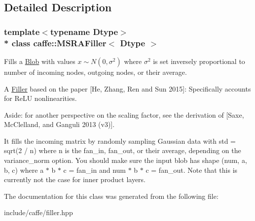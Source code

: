 \subsection{Detailed Description}
\subsubsection*{template$<$typename Dtype$>$\\*
class caffe\+::\+M\+S\+R\+A\+Filler$<$ Dtype $>$}

Fills a \hyperlink{classcaffe_1_1Blob}{Blob} with values $ x \sim N(0, \sigma^2) $ where $ \sigma^2 $ is set inversely proportional to number of incoming nodes, outgoing nodes, or their average. 

A \hyperlink{classcaffe_1_1Filler}{Filler} based on the paper \mbox{[}He, Zhang, Ren and Sun 2015\mbox{]}\+: Specifically accounts for Re\+LU nonlinearities.

Aside\+: for another perspective on the scaling factor, see the derivation of \mbox{[}Saxe, Mc\+Clelland, and Ganguli 2013 (v3)\mbox{]}.

It fills the incoming matrix by randomly sampling Gaussian data with std = sqrt(2 / n) where n is the fan\+\_\+in, fan\+\_\+out, or their average, depending on the variance\+\_\+norm option. You should make sure the input blob has shape (num, a, b, c) where a $\ast$ b $\ast$ c = fan\+\_\+in and num $\ast$ b $\ast$ c = fan\+\_\+out. Note that this is currently not the case for inner product layers. 

The documentation for this class was generated from the following file\+:\begin{DoxyCompactItemize}
\item 
include/caffe/filler.\+hpp\end{DoxyCompactItemize}
